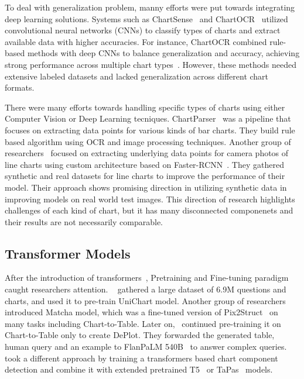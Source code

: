 \documentclass[
	letterpaper, %
]{jdf}
\begin{document}
    To deal with generalization problem, manny efforts were put towards integrating deep learning solutions.
    Systems such as ChartSense~\cite{jung2017chartsense} and ChartOCR~\cite{luo2021chartocr} utilized convolutional neural networks (CNNs) to classify types of charts and extract available data with higher accuracies.
    For instance, ChartOCR combined rule-based methods with deep CNNs to balance generalization and accuracy, achieving strong performance across multiple chart types~\cite{luo2021chartocr}.
    However, these methods needed extensive labeled datasets and lacked generalization across different chart formats.

    There were many efforts towards handling specific types of charts using either Computer Vision or Deep Learning tecniques.
    ChartParser~\cite{kumar2022chartparser} was a pipeline that focuses on extracting data points for various kinds of bar charts.
    They build rule based algorithm using OCR and image processing techniques.
    Another group of researchers~\cite{li2022chart} focused on extracting underlying data points for camera photos of line charts using custom architecture based on Faster-RCNN~\cite{ren2015faster}.
    They gathered synthetic and real datasets for line charts to improve the performance of their model.
    Their approach shows promising direction in utilizing synthetic data in improving models on real world test images.
    This direction of research highlights challenges of each kind of chart, but it has many disconnected componenets and their results are not necessarily comparable.

    \subsection{Transformer Models}\label{ssect:pretraining-and-fine-tuning}
After the introduction of transformers~\cite{vaswani2017attention}, Pretraining and Fine-tuning paradigm caught researchers attention.
~\cite{masry2023unichart} gathered a large dataset of 6.9M questions and charts, and used it to pre-train UniChart model.
Another group of researchers~\cite{liu2022matcha} introduced Matcha model, which was a fine-tuned version of Pix2Struct~\cite{lee2023pix2struct} on many tasks including Chart-to-Table.
Later on,~\cite{liu2022deplot} continued pre-training it on Chart-to-Table only to create DePlot.
They forwarded the generated table, human query and an example to FlanPaLM 540B~\cite{chung2024scaling} to answer complex queries.
~\cite{cheng2023chartreader} took a different approach by training a transformers based chart component detection and combine it with extended pretrained T5~\cite{raffel2020exploring} or TaPas~\cite{herzig2020tapas} models.
\end{document}
